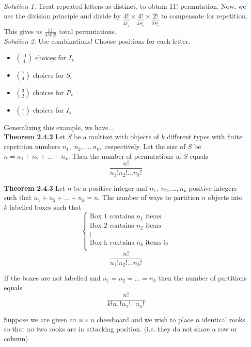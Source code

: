 \documentclass[12pt]{article}
\begin{document}
{\sl Solution 1.} Treat repeated letters as distinct, to obtain 11! permutation. Now, we use the division principle and divide by $\underbrace{4!}_{4I_s}\times \underbrace{4!}_{4S_s}\times\underbrace{2!}_{2P_s}$ to compensate for repetition. This gives us $\frac{11!}{4!4!2!}$ total permutations.\\

{\sl Solution 2.} Use combinations! Choose positions for each letter.
\begin{itemize}
    \item $\binom{11}{4}$ choices for $I_s$
    \item $\binom{7}{4}$ choices for $S_s$
    \item $\binom{3}{2}$ choices for $P_s$
    \item $\binom{1}{1}$ choices for $I_s$
\end{itemize}

\vspace{2\baselineskip}
Generalizing this example, we have...\\

{\bf Theorem 2.4.2} Let $S$ be a multiset with objects of $k$ different types with finite repetition numbers $n_1,\;n_2,...,n_k,$ respectively. Let the size of $S$ be $n=n_1+n_2+...+n_k$. Then the number of permutations of $S$ equals $$\frac{n!}{n_1!n_2!\ldots n_k!}$$

\vspace{1\baselineskip}
{\bf Theorem 2.4.3} Let $n$ be a positive integer and $n_1,\;n_2,...,n_k$ positive integers such that $n_1+n_2+...+n_k=n.$ The number of ways to partition $n$ objects into $k$ labelled boxes such that 
$$\begin{cases}
\text{Box 1 contains $n_1$ items}\\
\text{Box 2 contains $n_2$ items}\\
\vdots\\
\text{Box k contains $n_k$ items is}\\
\end{cases}$$
$$\frac{n!}{n_1!n_2!\ldots n_k!}$$

\vspace{1.5\baselineskip}
If the boxes are not labelled and $n_1=n_2=...=n_k$ then the number of partitions equals $$\frac{n!}{k!n_1!n_2!...n_k!}$$

Suppose we are given an $n\times n$ chessboard and we wish to place $n$ identical rooks so that no two rooks are in attacking position. (i.e. they do not share a row or column)\\
\end{document}
